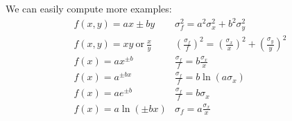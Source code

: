    We can easily compute more examples:
    \[
        \begin{array}{ll}
            f(x, y) = ax \pm by & \sigma_f^2 = a^2\sigma_x^2 + b^2\sigma_y^2\\
            f(x, y) = xy~\text{or}~\frac{x}{y} & \left(\frac{\sigma_f}{f}\right)^2 = \left(\frac{\sigma_x}{x}\right)^2 + \left(\frac{\sigma_y}{y}\right)^2\\
            f(x) = ax^{\pm b} & \frac{\sigma_f}{f} = b\frac{\sigma_x}{x}\\
            f(x) = a^{\pm bx} & \frac{\sigma_f}{f} = b\ln(a\sigma_x)\\
            f(x) = ae^{\pm b} & \frac{\sigma_f}{f} = b\sigma_x\\
            f(x) = a\ln(\pm bx) & \sigma_f = a\frac{\sigma_x}{x}\\
        \end{array}
    \]